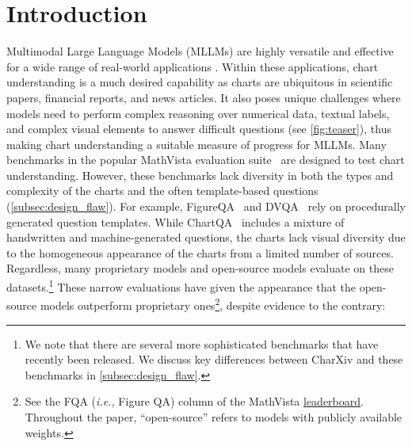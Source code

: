 \label{sec:introduction}

\section{Introduction}

Multimodal Large Language Models (MLLMs) \cite{alayrac2022flamingo, liu2023llava, dai2023instructblip, wang2023cogvlm, liu2023improvedllava, chen2023internvl, dong2024internlmxcomposer24khd, chen2024far, laurençon2023obelics, laurenccon2024matters, bai2023qwenvl, openai2024gpt4, claude3, rekateam2024reka, team2023gemini, li2024minigemini} are highly versatile and effective for a wide range of real-world applications \cite{masry2022chartqa, mathew2021docvqa, fu2024mme, liu2024mmbench, yu2023mm, lu2022learn, mathew2022infographicvqa, lu2024mathvista, yue2023mmmu}. 
Within these applications, chart understanding is a much desired capability as charts are ubiquitous in scientific papers, financial reports, and news articles. It also poses unique challenges where models need to perform complex reasoning over numerical data, textual labels, and complex visual elements to answer difficult questions (see \cref{fig:teaser}), thus making chart understanding a suitable measure of progress for MLLMs.
Many benchmarks in the popular MathVista evaluation suite~\citep{lu2024mathvista} are designed to test chart understanding.
However, these benchmarks lack diversity in both the types and complexity of the charts and the often template-based questions (\cref{subsec:design_flaw}). For example, FigureQA~\citep{kahou2017figureqa} and DVQA~\citep{kafle2018dvqa} rely on procedurally generated question templates. While ChartQA~\citep{masry2022chartqa} includes a mixture of handwritten and machine-generated questions, the charts lack visual diversity due to the homogeneous appearance of the charts from a limited number of sources. 
Regardless, many proprietary models \cite{openai2024gpt4, team2023gemini, claude3, rekateam2024reka} and open-source models \cite{chen2024far,dong2024internlmxcomposer24khd, chen2023internvl,laurenccon2024matters,viscpm,li2024minigemini,liu2024llavanext,gao2024sphinxx} evaluate on these datasets.\footnote{We note that there are several more sophisticated benchmarks \cite{xu2024chartbench, xia2024chartx, liu2024mmc} that have recently been released. We discuss key differences between CharXiv and these benchmarks in \cref{subsec:design_flaw}.}
These narrow evaluations have given the appearance that the open-source models outperform proprietary ones\footnote{See the FQA (\textit{i.e.,} Figure QA) column of the MathVista \href{https://mathvista.github.io/}{leaderboard}. Throughout the paper, ``open-source'' refers to models with publicly available weights.}, despite evidence to the contrary: 
